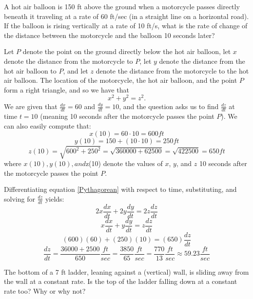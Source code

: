 \documentclass[handout,nooutcomes]{ximera}
\renewenvironment{freeResponse}{
\ifhandout\setbox0\vbox\bgroup\else
\begin{trivlist}\item[\hskip \labelsep\bfseries Solution:\hspace{2ex}]
\fi}
{\ifhandout\egroup\else
\end{trivlist}
\fi}
\newcommand{\dd}[2][]{\frac{d #1}{d #2}}
\begin{document}
\begin{problem}
  A hot air balloon is 150 ft above the ground when a motorcycle passes directly beneath it traveling at a rate of 60 ft/sec (in a straight line on a horizontal road).
  If the balloon is rising vertically at a rate of 10 ft/s, what is the rate of change of the distance between the motorcycle and the balloon 10 seconds later?
  \begin{freeResponse}
    Let $P$ denote the point on the ground directly below the hot air balloon, let $x$ denote the distance from the motorcycle to $P$, let $y$ denote the distance from the hot air balloon to $P$, and let $z$ denote the distance from the motorcycle to the hot air balloon.
    The location of the motorcycle, the hot air balloon, and the point $P$ form a right triangle, and so we have that
    \begin{equation}\label{Pythagorean}
      x^2 + y^2 = z^2.
    \end{equation}
    We are given that $\dd[x]{t} = 60$ and $\dd[y]{t} = 10$, and the question asks us to find $\dd[z]{t}$ at time $t=10$ (meaning 10 seconds after the motorcycle passes the point $P$).
    We can also easily compute that:
		$$ x(10) = 60 \cdot 10 = 600 ft $$
		$$ y(10) = 150 + (10 \cdot 10) = 250 ft $$
		$$ z(10) = \sqrt{ 600^2 + 250^2} = \sqrt{360000 + 62500} = \sqrt{422500} = 650 ft $$
		where $x(10), y(10), and $z(10) denote the values of $x$, $y$, and $z$ 10 seconds after the motorcycle passes the point $P$.  
		
                Differentiating equation \ref{Pythagorean} with respect to time, substituting, and solving for $\dd[z]{t}$ yields:
		$$ 2x \dd[x]{t} + 2y \dd[y]{t} = 2z \dd[z]{t} $$
		$$ x \dd[x]{t} + y \dd[y]{t} = z \dd[z]{t} $$
		$$ (600)(60) + (250)(10) = (650) \dd[z]{t} $$
		$$ \dd[z]{t} = \frac{36000 + 2500}{650} \frac{ft}{sec} = \frac{3850}{65} \frac{ft}{sec} = \frac{770}{13} \frac{ft}{sec} \approx 59.23 \frac{ft}{sec} $$
		\end{freeResponse}
\end{problem}

\begin{problem}
  The bottom of a 7 ft ladder, leaning against a (vertical) wall, is sliding away from the wall at a constant rate.
  Is the top of the ladder falling down at a constant rate too?
  Why or why not?
\end{problem}
\end{document}
